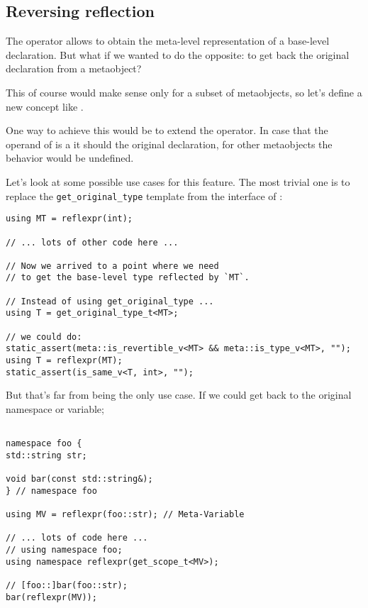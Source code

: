 \subsection{Reversing reflection}

The \verb@reflexpr@ operator allows to obtain the meta-level representation
of a base-level declaration. But what if we wanted to do the opposite: to
get back the original declaration from a metaobject?

This of course would make sense only for a subset of metaobjects, so let's
define a new concept like .

One way to achieve this would be to extend the \verb@reflexpr@
operator. In case that the operand of \verb@reflexpr@ is a 
it should  the original declaration, for other metaobjects the behavior
would be undefined.

Let's look at some possible use cases for this feature.
The most trivial one is to replace the \texttt{get\_original\_type}
template from the interface of :

\begin{verbatim}
using MT = reflexpr(int);

// ... lots of other code here ...

// Now we arrived to a point where we need
// to get the base-level type reflected by `MT`.

// Instead of using get_original_type ...
using T = get_original_type_t<MT>;

// we could do:
static_assert(meta::is_revertible_v<MT> && meta::is_type_v<MT>, "");
using T = reflexpr(MT);
static_assert(is_same_v<T, int>, "");

\end{verbatim}

But that's far from being the only use case. If we could get back to
the original namespace or variable;

\begin{verbatim}

namespace foo {
std::string str;

void bar(const std::string&);
} // namespace foo

using MV = reflexpr(foo::str); // Meta-Variable

// ... lots of code here ...
// using namespace foo;
using namespace reflexpr(get_scope_t<MV>);

// [foo::]bar(foo::str);
bar(reflexpr(MV));

\end{verbatim}

